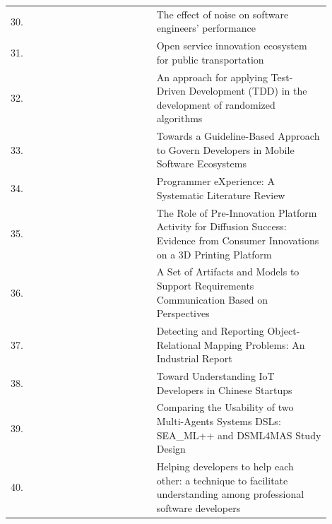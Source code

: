 \documentclass[english, 12pt, a4paper, sci, utf8, a-1b, online]{aaltothesis}
\begin{document}
\begin{center}
\begin{longtable}{p{0.05\linewidth}p{0.35\linewidth}p{0.5\linewidth}}
    30. & \textcite{romano2018effect}                           & The effect of noise on software engineers' performance                                                                                      \\
    31. & \textcite{open-service-innovation}                    & Open service innovation ecosystem for public transportation                                                                                 \\
    32. & \textcite{ivo2018approach}                            & An approach for applying Test-Driven Development (TDD) in the development of randomized algorithms                                          \\
    33. & \textcite{de2017towards}                              & Towards a Guideline-Based Approach to Govern Developers in Mobile Software Ecosystems                                                       \\
    34. & \textcite{programmer-experience}                      & Programmer eXperience: A Systematic Literature Review                                                                                       \\
    35. & \textcite{claussen2019role}                           & The Role of Pre-Innovation Platform Activity for Diffusion Success: Evidence from Consumer Innovations on a 3D Printing Platform            \\
    36. & \textcite{oran2017set}                                & A Set of Artifacts and Models to Support Requirements Communication Based on Perspectives                                                   \\
    37. & \textcite{nazariodetecting}                           & Detecting and Reporting Object-Relational Mapping Problems: An Industrial Report                                                            \\
    38. & \textcite{zhang2018toward}                            & Toward Understanding IoT Developers in Chinese Startups                                                                                     \\
    39. & \textcite{silva-comparing}                            & Comparing the Usability of two Multi-Agents Systems DSLs: SEA\_ML++ and DSML4MAS Study Design                                               \\
    40. & \textcite{ollis2019helping}                           & Helping developers to help each other: a technique to facilitate understanding among professional software developers                       \\

\end{longtable}
\end{center}
\end{document}
